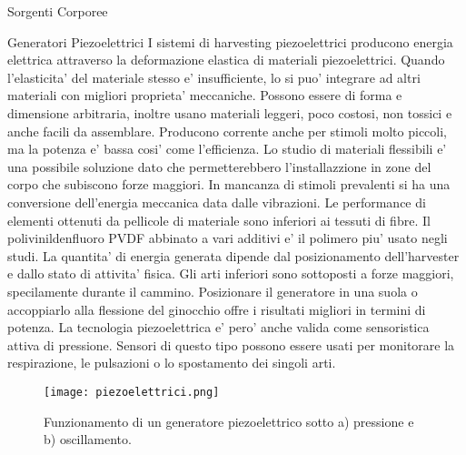 \begin{section}{Sorgenti Corporee}
   \begin{subsection}{Generatori Piezoelettrici}
    I sistemi di harvesting piezoelettrici producono energia elettrica attraverso la deformazione elastica di materiali piezoelettrici. Quando l'elasticita' del materiale stesso e' insufficiente, lo si puo' integrare ad altri materiali con migliori proprieta' meccaniche. Possono essere di forma e dimensione arbitraria, inoltre usano materiali leggeri, poco costosi, non tossici e anche facili da assemblare. Producono corrente anche per stimoli molto piccoli, ma la potenza e' bassa cosi' come l'efficienza. Lo studio di materiali flessibili e' una possibile soluzione dato che permetterebbero l'installazzione in zone del corpo che subiscono forze maggiori. In mancanza di stimoli prevalenti si ha una conversione dell'energia meccanica data dalle vibrazioni. Le performance di elementi ottenuti da pellicole di materiale sono inferiori ai tessuti di fibre. Il polivinildenfluoro PVDF abbinato a vari additivi e' il polimero piu' usato negli studi. La quantita' di energia generata dipende dal posizionamento dell'harvester e dallo stato di attivita' fisica. Gli arti inferiori sono sottoposti a forze maggiori, specilamente durante il cammino. Posizionare il generatore in una suola o accoppiarlo alla flessione del ginocchio offre i risultati migliori in termini di potenza. La tecnologia piezoelettrica e' pero' anche valida come sensoristica attiva di pressione. Sensori di questo tipo possono essere usati per monitorare la respirazione, le pulsazioni o lo spostamento dei singoli arti.
    \begin{figure}[H]
        \texttt{[image: piezoelettrici.png]}
        \centering
        \caption{Funzionamento di un generatore piezoelettrico sotto a) pressione e b) oscillamento.}
        \label{fig:piezoelettrici}
    \end{figure}
   \end{subsection}


\end{section}
